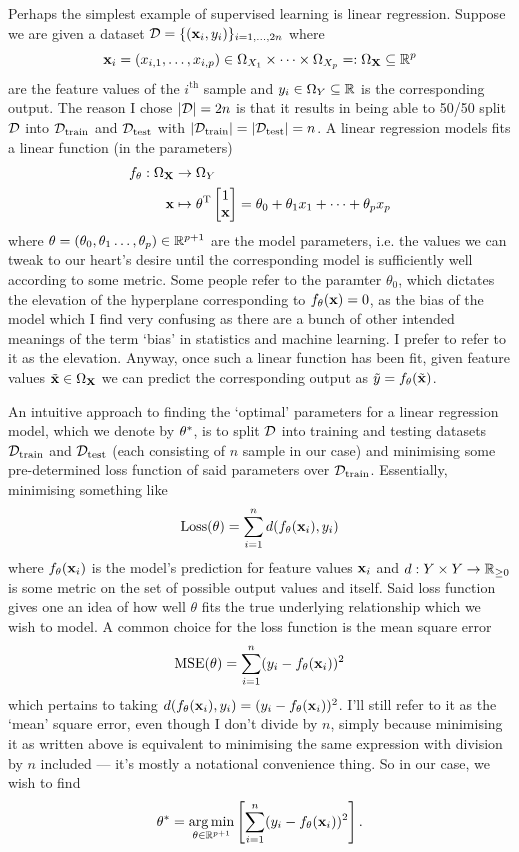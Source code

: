 \documentclass[11pt]{article}
\begin{document}
\noindent Perhaps the simplest example of supervised learning is linear regression. Suppose we are given a dataset $\mathcal{D}=\{(\mathbf{x}_i,y_i)\}_{i=1,\dots,2n}$ where
$$
\mathbf{x}_i=(x_{i,1},\dots,x_{i, p})\in \Omega_{X_1}\times\dots\times \Omega_{X_p}=:\Omega_{\mathbf{X}}\subseteq\mathbb{R}^p
$$
are the feature values of the $i^{\text{th}}$ sample and $y_i\in \Omega_{Y}\subseteq\mathbb{R}$ is the corresponding output. The reason I chose $|\mathcal{D}|=2n$ is that it results in being able to 50/50 split $\mathcal{D}$ into $\mathcal{D}_{\text{train}}$ and $\mathcal{D}_{\text{test}}$ with $|\mathcal{D}_{\text{train}}|=|\mathcal{D}_{\text{test}}|=n$. A linear regression models fits a linear function (in the parameters)
\begin{align*}
    f_{\theta}:\Omega_{\mathbf{X}}&\rightarrow \Omega_Y\\
    \mathbf{x}&\mapsto
    \theta^{\text{T}}
    \begin{bmatrix}
        1\\
        \mathbf{x}
    \end{bmatrix}
    =
    \theta_0+\theta_1x_1+\dots+\theta_px_p    
\end{align*}
where $\theta=(\theta_0,\theta_1\dots,\theta_p)\in\mathbb{R}^{p+1}$ are the model parameters, i.e. the values we can tweak to our heart's desire until the corresponding model is sufficiently well according to some metric. Some people refer to the paramter $\theta_0$, which dictates the elevation of the hyperplane corresponding to $f_{\theta}(\mathbf{x})=0$, as the bias of the model which I find very confusing as there are a bunch of other intended meanings of the term `bias' in statistics and machine learning. I prefer to refer to it as the elevation. Anyway, once such a linear function has been fit, given feature values $\tilde{\mathbf{x}}\in\Omega_{\mathbf{X}}$ we can predict the corresponding output as $\tilde{y}=f_{\theta}(\tilde{\mathbf{x}})$.

An intuitive approach to finding the `optimal' parameters for a linear regression model, which we denote by $\theta^{*}$, is to split $\mathcal{D}$ into training and testing datasets $\mathcal{D}_{\text{train}}$ and $\mathcal{D}_{\text{test}}$ (each consisting of $n$ sample in our case) and minimising some pre-determined loss function of said parameters over $\mathcal{D}_{\text{train}}$. Essentially, minimising something like
$$
\text{Loss}(\theta)=\sum_{i=1}^nd(f_{\theta}(\mathbf{x}_i), y_i)
$$
where $f_{\theta}(\mathbf{x}_i)$ is the model's prediction for feature values $\mathbf{x}_i$ and $d:Y\times Y\rightarrow\mathbb{R}_{\geq0}$ is some metric on the set of possible output values and itself. Said loss function gives one an idea of how well $\theta$ fits the true underlying relationship which we wish to model. A common choice for the loss function is the mean square error
$$
\text{MSE}(\theta)=\sum_{i=1}^n(y_i-f_{\theta}(\mathbf{x}_i))^2
$$
which pertains to taking $d(f_{\theta}(\mathbf{x}_i), y_i)=(y_i-f_{\theta}(\mathbf{x}_i))^2$. I'll still refer to it as the `mean' square error, even though I don't divide by $n$, simply because minimising it as written above is equivalent to minimising the same expression with division by $n$ included — it's mostly a notational convenience thing. So in our case, we wish to find
$$
\theta^{*}=\operatorname*{arg\,min}_{\theta\in\mathbb{R}^{p+1}}\left[\sum_{i=1}^n(y_i-f_{\theta}(\mathbf{x}_i))^2\right].
$$
\end{document}
